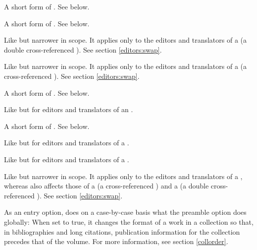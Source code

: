 \documentclass[11pt,letterpaper,oneside]{article}
\begin{document}
\begin{optionlist}
A short form of . See below.


A short form of . See below.


Like  but narrower in scope. It applies only to the
editors and translators of a  (a double
cross-referenced ). See section \ref{editors:swap}.


Like  but narrower in scope. It applies only to the
editors and translators of a  (a cross-referenced
). See section \ref{editors:swap}.


A short form of . See below.


Like  but for editors and translators of an
.


A short form of . See below.


Like  but for editors and translators of a
.


Like  but for editors and translators of a
.


Like  but narrower in scope. It applies only to the
editors and translators of a , whereas
 also affects those of a  (a
cross-referenced ) and a  (a
double cross-referenced ). See section
\ref{editors:swap}.


\noindent As an entry option,  does on a case-by-case
basis what the  preamble option does globally: When set
to true, it changes the format of a work in a collection so that, in
bibliographies and long citations, publication information for the
collection precedes that of the volume. For more information, see
section \ref{collorder}.

\end{optionlist}
\end{document}
